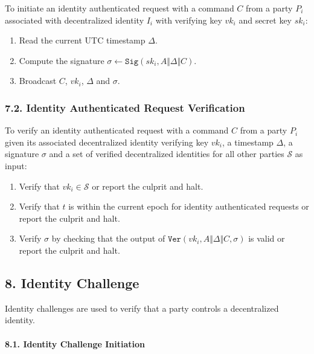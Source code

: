 \documentclass[
]{article}
\providecommand{\tightlist}{%
  \setlength{\itemsep}{0pt}\setlength{\parskip}{0pt}}
\begin{document}
To initiate an identity authenticated request with a command \(C\) from
a party \(P_i\) associated with decentralized identity \(I_i\) with
verifying key \(vk_i\) and secret key \(sk_i\):

\begin{enumerate}
\def\labelenumi{\arabic{enumi}.}
\tightlist
\item
  Read the current UTC timestamp \(\Delta\).
\item
  Compute the signature
  \(\sigma \leftarrow \mathtt{Sig}(sk_i, A \Vert \Delta \Vert C)\).
\item
  Broadcast \(C\), \(vk_i\), \(\Delta\) and \(\sigma\).
\end{enumerate}

\hypertarget{identity-authed-request-verification}{%
\subsubsection{7.2. Identity Authenticated Request
Verification}\label{identity-authed-request-verification}}

To verify an identity authenticated request with a command \(C\) from a
party \(P_i\) given its associated decentralized identity verifying key
\(vk_i\), a timestamp \(\Delta\), a signature \(\sigma\) and a set of
verified decentralized identities for all other parties \(\mathcal{S}\)
as input:

\begin{enumerate}
\def\labelenumi{\arabic{enumi}.}
\tightlist
\item
  Verify that \(vk_i \in \mathcal{S}\) or report the culprit and halt.
\item
  Verify that \(t\) is within the current epoch for identity
  authenticated requests or report the culprit and halt.
\item
  Verify \(\sigma\) by checking that the output of
  \(\mathtt{Ver}(vk_i, A \Vert \Delta \Vert C, \sigma)\) is valid or
  report the culprit and halt.
\end{enumerate}

\hypertarget{identity-challenge}{%
\subsection{8. Identity Challenge}\label{identity-challenge}}

Identity challenges are used to verify that a party controls a
decentralized identity.

\hypertarget{identity-challenge-initiation}{%
\paragraph{8.1. Identity Challenge
Initiation}\label{identity-challenge-initiation}}
\end{document}

